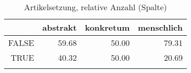 \begin{table}[ht]
\centering
\begin{tabular}{rrrr}
  \lsptoprule
 & abstrakt & konkretum & menschlich \\ 
  \midrule
FALSE & 59.68 & 50.00 & 79.31 \\ 
  TRUE & 40.32 & 50.00 & 20.69 \\ 
   \lspbottomrule
\end{tabular}
\caption{Artikelsetzung, relative Anzahl (Spalte)} 
\end{table}
